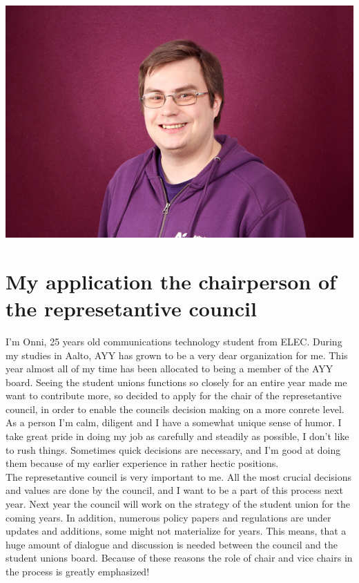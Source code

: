 \documentclass[a4paper, 12pt, finnish]{report}
\newcommand{\topic}{My application the chairperson of the represetantive council}
\begin{document}
\includegraphics{onnilampi_ayy.jpg}
\section*{\topic}


I'm Onni, 25 years old communications technology student from ELEC.
During my studies in Aalto, AYY has grown to be a very dear organization for me.
This year almost all of my time has been allocated to being a member of the AYY board.
Seeing the student unions functions so closely for an entire year made me want to contribute more, so decided to apply for the chair of the represetantive council, in order to enable the councils decision making on a more conrete level. \\


As a person I'm calm, diligent and I have a somewhat unique sense of humor.
I take great pride in doing my job as carefully and steadily as possible, I don't like to rush things.
Sometimes quick decisions are necessary, and I'm good at doing them because of my earlier experience in rather hectic positions.\\

The represetantive council is very important to me.
All the most crucial decisions and values are done by the council, and I want to be a part of this process next year.
Next year the council will work on the strategy of the student union for the coming years.
In addition, numerous policy papers and regulations are under updates and additions, some might not materialize for years.
This means, that a huge amount of dialogue and discussion is needed between the council and the student unions board.
Because of these reasons the role of chair and vice chairs in the process is greatly emphasized!\\
\end{document}
